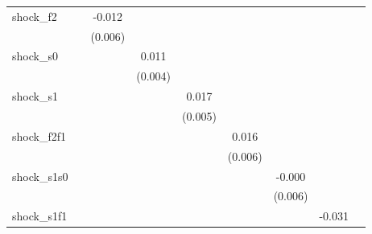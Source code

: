 {\begin{tabular}{l*{8}{c}}
\addlinespace
shock\_f2    &                     &      -0.012\sym{*}  &                     &                     &                     &                     &                     &                     \\
            &                     &     (0.006)         &                     &                     &                     &                     &                     &                     \\
\addlinespace
shock\_s0    &                     &                     &       0.011\sym{**} &                     &                     &                     &                     &                     \\
            &                     &                     &     (0.004)         &                     &                     &                     &                     &                     \\
\addlinespace
shock\_s1    &                     &                     &                     &       0.017\sym{***}&                     &                     &                     &                     \\
            &                     &                     &                     &     (0.005)         &                     &                     &                     &                     \\
\addlinespace
shock\_f2f1  &                     &                     &                     &                     &       0.016\sym{**} &                     &                     &                     \\
            &                     &                     &                     &                     &     (0.006)         &                     &                     &                     \\
\addlinespace
shock\_s1s0  &                     &                     &                     &                     &                     &      -0.000         &                     &                     \\
            &                     &                     &                     &                     &                     &     (0.006)         &                     &                     \\
\addlinespace
shock\_s1f1  &                     &                     &                     &                     &                     &                     &      -0.031\sym{**} &                     \\

\end{tabular}}
